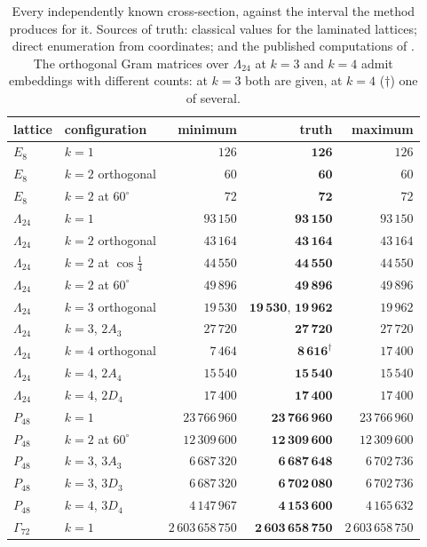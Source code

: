 \documentclass[11pt]{amsart}
\theoremstyle{remark}
\newcommand{\Leech}{\Lambda_{24}}
\newcommand{\Pff}{P_{48}}
\newcommand{\Gsz}{\Gamma_{72}}
\begin{document}
\begin{table}[ht]
\caption{Every independently known cross-section, against the interval the
method produces for it. Sources of truth: classical values for the laminated
lattices; direct enumeration from coordinates; and the published computations
of \cite{boyvalenkov-cherkashin2025,ozeki2016,sun-wang2026}. The orthogonal Gram matrices over $\Leech$ at $k=3$ and
$k=4$ admit embeddings with different counts: at $k=3$ both are given, at $k=4$
($\dagger$) one of several.}
\label{tab:validate}
\begin{tabular}{llrrr}
\toprule
lattice & configuration & minimum & \textbf{truth} & maximum \\
\midrule
$E_8$    & $k=1$                   & $126$ & $\mathbf{126}$ & $126$ \\
$E_8$    & $k=2$ orthogonal        & $60$ & $\mathbf{60}$ & $60$ \\
$E_8$    & $k=2$ at $60^\circ$     & $72$ & $\mathbf{72}$ & $72$ \\
$\Leech$ & $k=1$                   & $93\,150$ & $\mathbf{93\,150}$ & $93\,150$ \\
$\Leech$ & $k=2$ orthogonal        & $43\,164$ & $\mathbf{43\,164}$ & $43\,164$ \\
$\Leech$ & $k=2$ at $\cos\tfrac14$ & $44\,550$ & $\mathbf{44\,550}$ & $44\,550$ \\
$\Leech$ & $k=2$ at $60^\circ$     & $49\,896$ & $\mathbf{49\,896}$ & $49\,896$ \\
$\Leech$ & $k=3$ orthogonal        & $19\,530$ & $\mathbf{19\,530},\,\mathbf{19\,962}$ & $19\,962$ \\
$\Leech$ & $k=3$, $2A_3$           & $27\,720$ & $\mathbf{27\,720}$ & $27\,720$ \\
$\Leech$ & $k=4$ orthogonal        & $7\,464$ & $\mathbf{8\,616}^{\dagger}$ & $17\,400$ \\
$\Leech$ & $k=4$, $2A_4$           & $15\,540$ & $\mathbf{15\,540}$ & $15\,540$ \\
$\Leech$ & $k=4$, $2D_4$           & $17\,400$ & $\mathbf{17\,400}$ & $17\,400$ \\
$\Pff$   & $k=1$                   & $23\,766\,960$ & $\mathbf{23\,766\,960}$ & $23\,766\,960$ \\
$\Pff$   & $k=2$ at $60^\circ$     & $12\,309\,600$ & $\mathbf{12\,309\,600}$ & $12\,309\,600$ \\
$\Pff$   & $k=3$, $3A_3$           & $6\,687\,320$ & $\mathbf{6\,687\,648}$ & $6\,702\,736$ \\
$\Pff$   & $k=3$, $3D_3$           & $6\,687\,320$ & $\mathbf{6\,702\,080}$ & $6\,702\,736$ \\
$\Pff$   & $k=4$, $3D_4$           & $4\,147\,967$ & $\mathbf{4\,153\,600}$ & $4\,165\,632$ \\
$\Gsz$   & $k=1$                   & $2\,603\,658\,750$ & $\mathbf{2\,603\,658\,750}$ & $2\,603\,658\,750$ \\
\bottomrule
\end{tabular}
\end{table}
\end{document}
